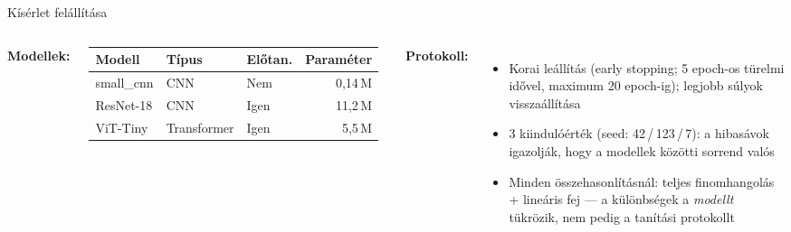 \documentclass{beamer}
\begin{document}
\begin{frame}{Kísérlet felállítása}

  \begin{columns}

      \textbf{Modellek:}

      \medskip
      \small
      \renewcommand{\arraystretch}{1.3}
      \begin{tabular}{@{}lllr@{}}
        \toprule
        Modell     & Típus       & Előtan. & Paraméter \\
        \midrule
        small\_cnn & CNN         & Nem & 0,14\,M \\
        ResNet-18  & CNN         & Igen & 11,2\,M \\
        ViT-Tiny   & Transformer & Igen & 5,5\,M \\
        \bottomrule
      \end{tabular}

      \footnotesize
      \textbf{Protokoll:}
      \begin{itemize}
        \item Korai leállítás (early stopping; 5 epoch-os türelmi idővel, maximum 20 epoch-ig); legjobb súlyok visszaállítása
        \item 3 kiindulóérték (seed: 42\,/\,123\,/\,7): a hibasávok igazolják, hogy a modellek közötti sorrend valós
        \item Minden összehasonlításnál: teljes finomhangolás + lineáris fej --- a különbségek a \emph{modellt} tükrözik, nem pedig a tanítási protokollt
      \end{itemize}

  \end{columns}


\end{frame}
\end{document}
